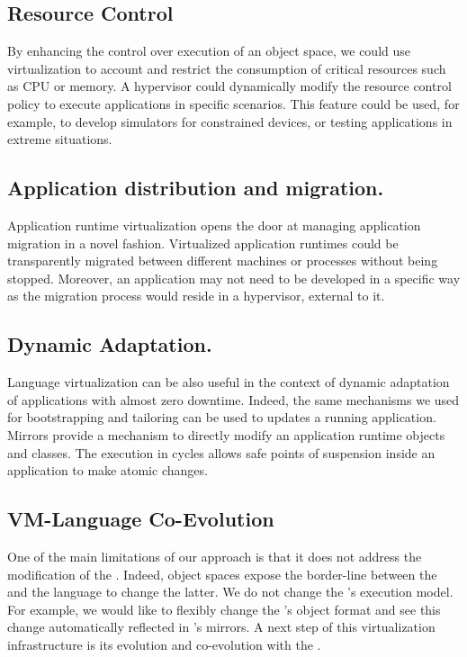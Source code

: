 \subsection{Resource Control} By enhancing the control over execution of an object space, we could use virtualization to account and restrict the consumption of critical resources such as CPU or memory. A hypervisor could dynamically modify the resource control policy to execute applications in specific scenarios. This feature could be used, for example, to develop simulators for constrained devices, or testing applications in extreme situations.

\subsection{Application distribution and migration.} Application runtime virtualization opens the door at managing application migration in a novel fashion. Virtualized application runtimes could be transparently migrated between different machines or processes without being stopped. Moreover, an application may not need to be developed in a specific way as the migration process would reside in a hypervisor, external to it.

\subsection{Dynamic Adaptation.} Language virtualization can be also useful in the context of dynamic adaptation of applications with almost zero downtime. Indeed, the same mechanisms we used for bootstrapping and tailoring can be used to updates a running application. Mirrors provide a mechanism to directly modify an application runtime objects and classes. The execution in cycles allows safe points of suspension inside an application to make atomic changes.

\subsection{VM-Language Co-Evolution} One of the main limitations of our approach is that it does not address the modification of the \VM. Indeed, object spaces expose the border-line between the \VM and the language to change the latter. We do not change the \VM's execution model. For example, we would like to flexibly change the \VM's object format and see this change automatically reflected in \Vtt's mirrors. A next step of this virtualization infrastructure is its evolution and co-evolution with the \VM.

